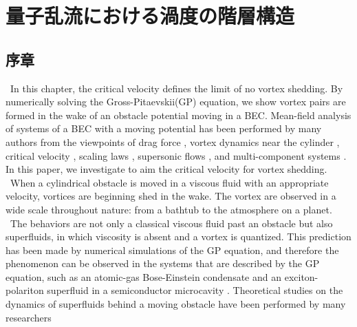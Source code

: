 \documentclass[12pt,a4paper]{jbook}
\begin{document}
\chapter{量子乱流における渦度の階層構造}
\section{序章}
\ In this chapter, the critical velocity defines the limit of no vortex shedding.
By numerically solving the Gross-Pitaevskii(GP) equation,
we show vortex pairs are formed in the wake of an obstacle potential moving in a BEC.
Mean-field analysis of systems of a BEC with a moving potential has been performed by
many authors from the viewpoints of drag force \cite{19}\cite{20}\cite{21}, vortex dynamics near the cylinder \cite{22}\cite{23},
critical velocity \cite{24}, scaling laws \cite{25}, supersonic flows \cite{26}\cite{27}, and multi-component systems \cite{28}\cite{29}.
In this paper, we investigate to aim the critical velocity for vortex shedding.
\\
\ When a cylindrical obstacle is moved in a viscous fluid with an appropriate velocity,
vortices are beginning shed in the wake.
The vortex are observed in a wide scale throughout nature: from a bathtub to
the atmosphere on a planet.
\ The behaviors are not only a classical viscous fluid past an obstacle but also superfluids,
in which viscosity is absent and a vortex is quantized. This prediction has been made by
numerical simulations of the GP equation, and therefore the phenomenon
can be observed in the systems that are described by the GP equation, such as an atomic-gas
Bose-Einstein condensate \cite{30} and an exciton-polariton superfluid in a
semiconductor microcavity \cite{31}\cite{32}. Theoretical studies on the dynamics of superfluids behind a
moving obstacle have been performed by many researchers
\end{document}
